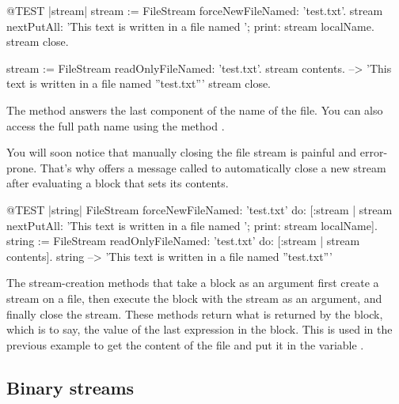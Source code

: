 \documentclass[a4paper,10pt,twoside]{book}
\begin{document}
{\begin{code}{@TEST |stream|}
stream := FileStream forceNewFileNamed: 'test.txt'.
stream
    nextPutAll: 'This text is written in a file named ';
    print: stream localName.
stream close.

stream := FileStream readOnlyFileNamed: 'test.txt'.
stream contents. --> 'This text is written in a file named ''test.txt'''
stream close.
\end{code}



The method  answers the last component of the name of the file. You can
also access the full path name using the method
.

You will soon notice that manually closing the file stream is
painful and error-prone. That's why  offers a message called  to
automatically close a new stream after evaluating a block that
sets its contents.

\begin{code}{@TEST |string|}
FileStream
    forceNewFileNamed: 'test.txt'
    do: [:stream |
        stream
            nextPutAll: 'This text is written in a file named ';
            print: stream localName].
string := FileStream
            readOnlyFileNamed: 'test.txt'
            do: [:stream | stream contents].
string --> 'This text is written in a file named ''test.txt'''
\end{code}

The stream-creation methods that take a block as an argument first
create a stream on a file, then execute the block with the stream
as an argument, and finally close the stream. These methods return what
is returned by the block, which is to say, the value of the last
expression in the block. This is used in the previous example to get
the content of the file and put it in the variable .

\subsection{Binary streams}

}
\end{document}
